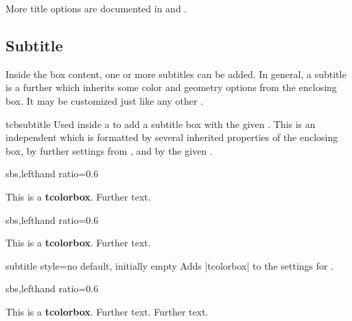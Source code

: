 \bigskip
\begin{marker}
More title options are documented in 
and .
\end{marker}

\clearpage
\subsection{Subtitle}

Inside the box content, one or more subtitles can be added.
In general, a subtitle is a further  which inherits some
color and geometry options from the enclosing box. It may be customized
just like any other .

\begin{docCommand}[doc new=2014-10-10]{tcbsubtitle}{}
  Used inside a  to add a subtitle box with the given .
  This is an independent  which is formatted by several
  inherited properties of the enclosing box, by further settings from
  , and by the given .
\begin{dispExample*}{sbs,lefthand ratio=0.6}
\begin{tcolorbox}[title=My title,
    colback=red!5!white,
    colframe=red!75!black,
    fonttitle=\bfseries]
  This is a \textbf{tcolorbox}.
  Further text.
\end{tcolorbox}
\end{dispExample*}
\begin{dispExample*}{sbs,lefthand ratio=0.6}
\begin{tcolorbox}[title=My title,
    colback=red!5!white,
    colframe=red!75!black,
    colbacktitle=yellow!50!red,
    coltitle=red!25!black,
    fonttitle=\bfseries]
  This is a \textbf{tcolorbox}.
  Further text.
\end{tcolorbox}
\end{dispExample*}
\end{docCommand}

\begin{docTcbKey}[][doc new=2014-10-10]{subtitle style}{=}{no default, initially empty}
  Adds |tcolorbox|  to the settings for .
\begin{dispExample*}{sbs,lefthand ratio=0.6}
\begin{tcolorbox}[title=My title,
  colback=red!5!white,
  colframe=red!75!black,
  colbacktitle=yellow!50!red,
  coltitle=red!25!black,
  fonttitle=\bfseries,
  subtitle style={boxrule=0.4pt,
    colback=yellow!50!red!25!white} ]
  This is a \textbf{tcolorbox}.
  Further text.
  Further text.
\end{tcolorbox}
\end{dispExample*}
\end{docTcbKey}

